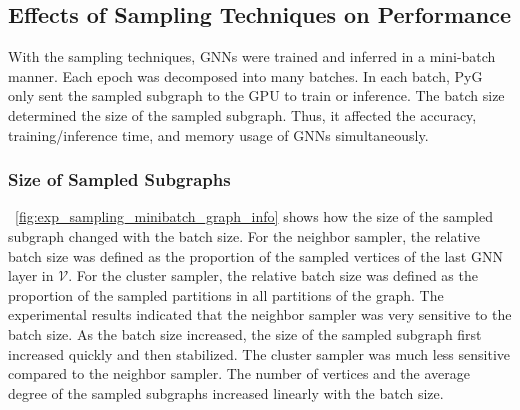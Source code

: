 \subsection{Effects of Sampling Techniques on Performance}
\label{sec:effects_of_sampling_techniques_on_performance}

With the sampling techniques, GNNs were trained and inferred in a mini-batch manner.
%
Each epoch was decomposed into many batches.
%
In each batch, PyG only sent the sampled subgraph to the GPU to train or inference.
%
The batch size determined the size of the sampled subgraph.
%
Thus, it affected the accuracy, training/inference time, and memory usage of GNNs simultaneously.

\subsubsection{Size of Sampled Subgraphs}

\figurename~\ref{fig:exp_sampling_minibatch_graph_info} shows how the size of the sampled subgraph changed with the batch size.
%
For the neighbor sampler, the relative batch size was defined as the proportion of the sampled vertices of the last GNN layer in $\mathcal{V}$.
%
For the cluster sampler, the relative batch size was defined as the proportion of the sampled partitions in all partitions of the graph.
%
The experimental results indicated that the neighbor sampler was very sensitive to the batch size.
%
As the batch size increased, the size of the sampled subgraph first increased quickly and then stabilized.
%
The cluster sampler was much less sensitive compared to the neighbor sampler.
%
The number of vertices and the average degree of the sampled subgraphs increased linearly with the batch size.

